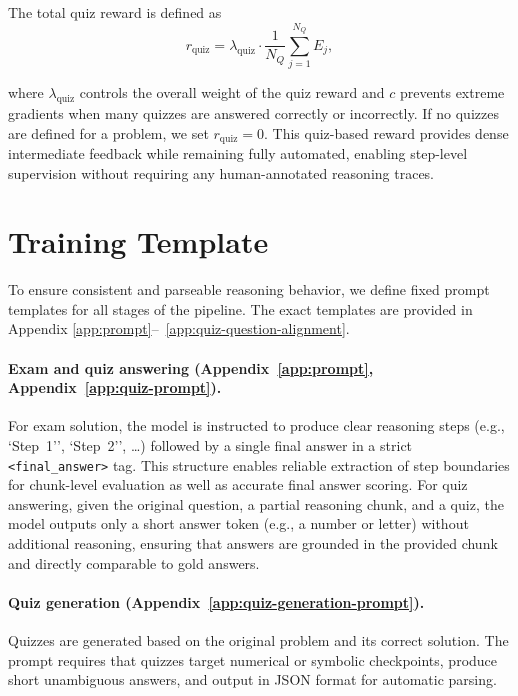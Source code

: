 \documentclass[12pt]{report}
\begin{document}
The total quiz reward is defined as
\begin{equation}
r_{\text{quiz}}
= \lambda_{\text{quiz}} \cdot
\frac{1}{N_Q} \sum_{j=1}^{N_Q} E_j,
\end{equation}

where $\lambda_{\text{quiz}}$ controls the overall weight of the quiz reward and
$c$ prevents extreme gradients when many quizzes are answered correctly or
incorrectly. If no quizzes are defined for a problem, we set $r_{\text{quiz}} = 0$. This quiz-based reward provides dense intermediate feedback while remaining fully automated, enabling step-level supervision without requiring any human-annotated reasoning traces.

\section{Training Template}
\label{sec:training-templates}
To ensure consistent and parseable reasoning behavior, we define fixed prompt templates for all stages of the pipeline. The exact templates are provided in Appendix \ref{app:prompt}–~\ref{app:quiz-question-alignment}.

\paragraph{Exam and quiz answering (Appendix~\ref{app:prompt}, Appendix~\ref{app:quiz-prompt}).}
For exam solution, the model is instructed to produce clear reasoning steps (e.g., `Step~1'', `Step~2'', \ldots) followed by a single final answer in a strict \texttt{<final\_answer>} tag. 
This structure enables reliable extraction of step boundaries for chunk-level evaluation as well as accurate final answer scoring. For quiz answering, given the original question, a partial reasoning chunk, and a quiz, the model outputs only a short answer token (e.g., a number or letter) without additional reasoning, ensuring that answers are grounded in the provided chunk and directly comparable to gold answers.

\paragraph{Quiz generation (Appendix~\ref{app:quiz-generation-prompt}).}
Quizzes are generated based on the original problem and its correct solution. The prompt requires that quizzes target numerical or symbolic checkpoints, produce short unambiguous answers, and output in JSON format for automatic parsing.
\end{document}
